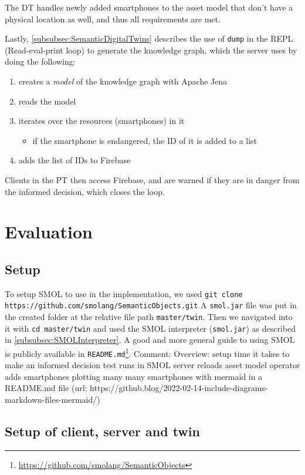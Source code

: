 \documentclass{article}
\begin{document}
The DT handles newly added smartphones to the asset model that don't have a physical location as well, and thus all requirements are met.

Lastly, \ref{subsubsec:SemanticDigitalTwins} describes the use of \verb|dump| in the REPL (Read-eval-print loop) to generate the knowledge graph, which the server uses by doing the following:
\begin{enumerate}
    \item creates a \emph{model} of the knowledge graph with Apache Jena
    \item reads the model
    \item iterates over the resources (smartphones) in it
    \begin{itemize}
        \item if the smartphone is endangered, the ID of it is added to a list 
    \end{itemize}
    \item adds the list of IDs to Firebase
\end{enumerate}

Clients in the PT then access Firebase, and are warned if they are in danger from the informed decision, which closes the loop.

\newpage
\section{Evaluation}\label{sec:Evaluation}
\subsection{Setup}\label{subsec:Setup}
To setup SMOL to use in the implementation, we used \newline 
\verb|git clone https://github.com/smolang/SemanticObjects.git|
A \verb|smol.jar| file was put in the created folder at the relative file path \verb|master/twin|. Then we navigated into it with \verb|cd master/twin| and used the SMOL interpreter (\verb|smol.jar|) as described in \ref{subsubsec:SMOLInterpreter}. A good and more general guide to using SMOL is publicly available in \verb|README.md|\footnote{\url{https://github.com/smolang/SemanticObjects}}.
Comment: Overview:
setup
time it takes to make an informed decision
test runs in SMOL
   server reloads asset model
   operator adds smartphones
plotting many many smartphones with mermaid in a README.md file (url: https://github.blog/2022-02-14-include-diagrams-markdown-files-mermaid/)


\subsection{Setup of client, server and twin}
\end{document}
